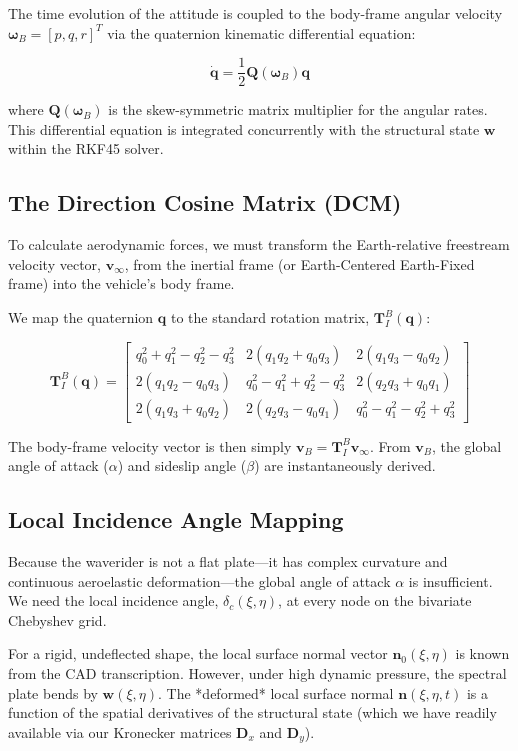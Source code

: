 \documentclass[11pt,a4paper]{article}
\theoremstyle{definition}
\numberwithin{equation}{section}
\begin{document}
The time evolution of the attitude is coupled to the body-frame angular velocity $\boldsymbol{\omega}_B = [p, q, r]^T$ via the quaternion kinematic differential equation:

$$\dot{\mathbf{q}} = \frac{1}{2} \mathbf{Q}(\boldsymbol{\omega}_B) \mathbf{q}$$

where $\mathbf{Q}(\boldsymbol{\omega}_B)$ is the skew-symmetric matrix multiplier for the angular rates. This differential equation is integrated concurrently with the structural state $\mathbf{w}$ within the RKF45 solver.

\subsection{The Direction Cosine Matrix (DCM)}
To calculate aerodynamic forces, we must transform the Earth-relative freestream velocity vector, $\mathbf{v}_\infty$, from the inertial frame (or Earth-Centered Earth-Fixed frame) into the vehicle's body frame.

We map the quaternion $\mathbf{q}$ to the standard rotation matrix, $\mathbf{T}_I^B(\mathbf{q})$:

$$\mathbf{T}_I^B(\mathbf{q}) = \begin{bmatrix} q_0^2 + q_1^2 - q_2^2 - q_3^2 & 2(q_1 q_2 + q_0 q_3) & 2(q_1 q_3 - q_0 q_2) \\ 2(q_1 q_2 - q_0 q_3) & q_0^2 - q_1^2 + q_2^2 - q_3^2 & 2(q_2 q_3 + q_0 q_1) \\ 2(q_1 q_3 + q_0 q_2) & 2(q_2 q_3 - q_0 q_1) & q_0^2 - q_1^2 - q_2^2 + q_3^2 \end{bmatrix}$$

The body-frame velocity vector is then simply $\mathbf{v}_B = \mathbf{T}_I^B \mathbf{v}_\infty$. From $\mathbf{v}_B$, the global angle of attack ($\alpha$) and sideslip angle ($\beta$) are instantaneously derived.

\subsection{Local Incidence Angle Mapping}
Because the waverider is not a flat plate—it has complex curvature and continuous aeroelastic deformation—the global angle of attack $\alpha$ is insufficient. We need the local incidence angle, $\delta_c(\xi, \eta)$, at every node on the bivariate Chebyshev grid.

For a rigid, undeflected shape, the local surface normal vector $\mathbf{n}_0(\xi, \eta)$ is known from the CAD transcription. However, under high dynamic pressure, the spectral plate bends by $\mathbf{w}(\xi, \eta)$. The *deformed* local surface normal $\mathbf{n}(\xi, \eta, t)$ is a function of the spatial derivatives of the structural state (which we have readily available via our Kronecker matrices $\mathbf{D}_x$ and $\mathbf{D}_y$).
\end{document}
